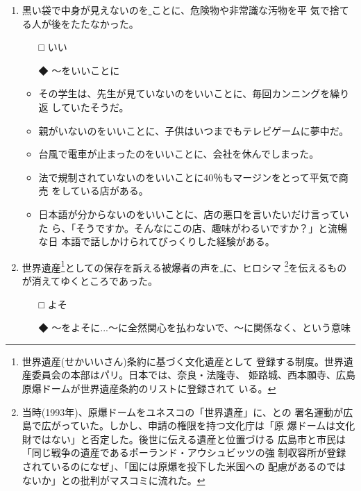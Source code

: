 \documentclass[
uplatex,
b5paper,
10pt,
dvipdfmx
]{jsbook}
\begin{document}
\begin{enumerate}
\item 黒い袋で中身が見えないのを\underline{   }ことに、危険物や非常識な汚物を平
      気で捨てる人が後をたたなかった。

\begin{itemize}
\item[□] いい
\item[◆] 〜をいいことに
\end{itemize}

\begin{itemize}
\item その学生は、先生が見ていないのをいいことに、毎回カンニングを繰り返
      していたそうだ。
\item 親がいないのをいいことに、子供はいつまでもテレビゲームに夢中だ。
\item 台風で電車が止まったのをいいことに、会社を休んでしまった。
\item 法で規制されていないのをいいことに40％もマージンをとって平気で商売
      をしている店がある。
\item 日本語が分からないのをいいことに、店の悪口を言いたいだけ言っていた
      ら、「そうですか。そんなにこの店、趣味がわるいですか？」と流暢な日
      本語で話しかけられてびっくりした経験がある。
\end{itemize}

\item 世界遺産\footnote{世界遺産(せかいいさん)条約に基づく文化遺産として
      登録する制度。世界遺産委員会の本部はパリ。日本では、奈良・法隆寺、
      姫路城、西本願寺、広島原爆ドームが世界遺産条約のリストに登録されて
      いる。}としての保存を訴える被爆者の声を\underline{   }に、ヒロシマ
      \footnote{当時(1993年)、原爆ドームをユネスコの「世界遺産」に、との
      署名運動が広島で広がっていた。しかし、申請の権限を持つ文化庁は「原
      爆ドームは文化財ではない」と否定した。後世に伝える遺産と位置づける
      広島市と市民は「同じ戦争の遺産であるポーランド・アウシュビッツの強
      制収容所が登録されているのになぜ」、「国には原爆を投下した米国への
      配慮があるのではないか」との批判がマスコミに流れた。}を伝えるもの
      が消えてゆくところであった。
\begin{itemize}
\item[□] よそ
\item[◆] 〜をよそに...〜に全然関心を払わないで、〜に関係なく、という意味
\end{itemize}


\end{enumerate}
\end{document}
